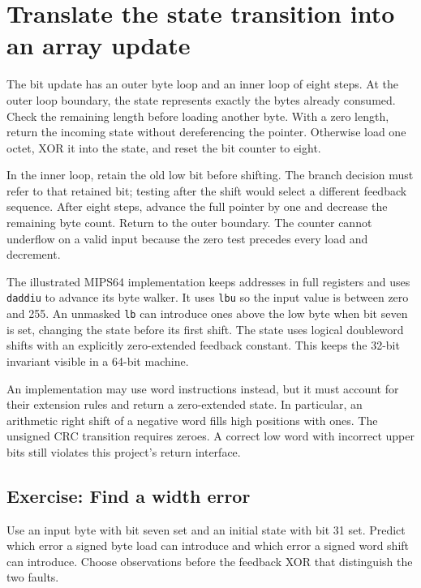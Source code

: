 \section{Translate the state transition into an array update}
The bit update has an outer byte loop and an inner loop of eight steps. At the outer
loop boundary, the state represents exactly the bytes already consumed. Check the
remaining length before loading another byte. With a zero length, return the incoming
state without dereferencing the pointer. Otherwise load one octet, XOR it into the
state, and reset the bit counter to eight.

In the inner loop, retain the old low bit before shifting. The branch decision must
refer to that retained bit; testing after the shift would select a different feedback
sequence. After eight steps, advance the full pointer by one and decrease the remaining
byte count. Return to the outer boundary. The counter cannot underflow on a valid
input because the zero test precedes every load and decrement.

The illustrated MIPS64 implementation keeps addresses in full registers and uses
\texttt{daddiu} to advance its byte walker. It uses \texttt{lbu} so the input
value is between zero and 255. An unmasked \texttt{lb} can introduce ones above the
low byte when bit seven is set, changing the state before its first shift.
The state uses logical doubleword shifts with an explicitly zero-extended feedback
constant. This keeps the 32-bit invariant visible in a 64-bit machine.

An implementation may use word instructions instead, but it must account for their
extension rules and return a zero-extended state. In particular, an arithmetic right
shift of a negative word fills high positions with ones. The unsigned CRC transition
requires zeroes. A correct low word with incorrect upper bits still violates this
project's return interface.

\subsection*{Exercise: Find a width error}
Use an input byte with bit seven set and an initial state with bit 31 set. Predict
which error a signed byte load can introduce and which error a signed word shift can
introduce. Choose observations before the feedback XOR that distinguish the two faults.
